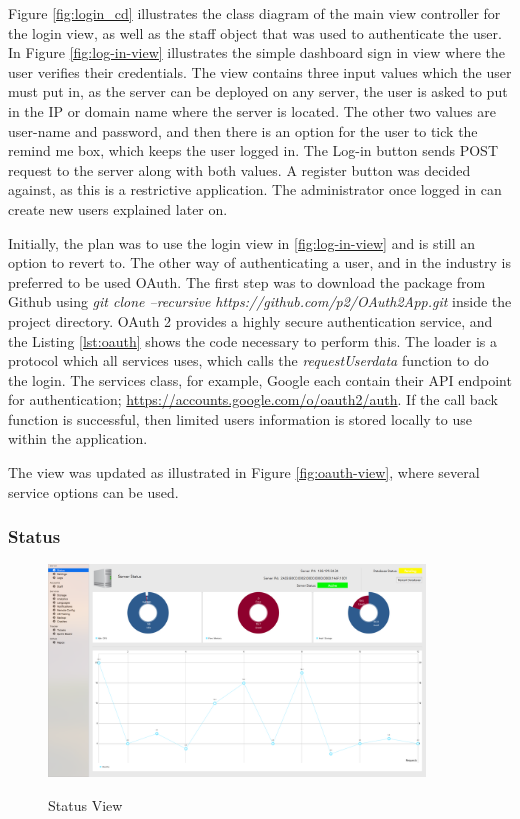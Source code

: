 Figure \ref{fig:login_cd} illustrates the class diagram of the main view controller for the login view, as well as the staff object that was used to authenticate the user. In Figure \ref{fig:log-in-view} illustrates the simple dashboard sign in view where the user verifies their credentials. The view contains three input values which the user must put in, as the server can be deployed on any server, the user is asked to put in the IP or domain name where the server is located. The other two values are user-name and password, and then there is an option for the user to tick the remind me box, which keeps the user logged in. The Log-in button sends POST request to the server along with both values. A register button was decided against, as this is a restrictive application. The administrator once logged in can create new users explained later on.

Initially, the plan was to use the login view in \ref{fig:log-in-view} and is still an option to revert to. The other way of authenticating a user, and in the industry is preferred to be used OAuth. The first step was to download the package from Github using \textit{git clone --recursive https://github.com/p2/OAuth2App.git} inside the project directory. OAuth 2 provides a highly secure authentication service, and the Listing \ref{lst:oauth} shows the code necessary to perform this. The loader is a protocol which all services uses, which calls the \textit{requestUserdata} function to do the login. The services class, for example, Google each contain their API endpoint for authentication;  \url{https://accounts.google.com/o/oauth2/auth}. If the call back function is successful, then limited users information is stored locally to use within the application.

The view was updated as illustrated in Figure \ref{fig:oauth-view}, where several service options can be used.



\subsubsection{Status}

\begin{figure}[!h]
    \caption{Status View}
    \centering
    \includegraphics[width=100mm]{images/dashboard/status_view}
    \label{fig:status-view}
\end{figure}

